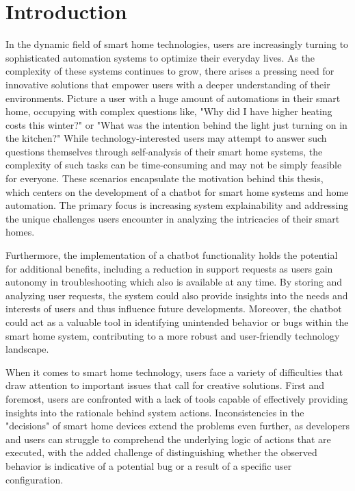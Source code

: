\chapter{Introduction}

In the dynamic field of smart home technologies, users are increasingly turning to sophisticated automation systems to optimize their everyday lives.
As the complexity of these systems continues to grow, there arises a pressing need for innovative solutions that empower users with a deeper understanding of their environments. 
Picture a user with a huge amount of automations in their smart home, occupying with complex questions like, "Why did I have higher heating costs this winter?" or "What was the intention behind the light just turning on in the kitchen?"
While technology-interested users may attempt to answer such questions themselves through self-analysis of their smart home systems, the complexity of such tasks can be time-consuming and may not be simply feasible for everyone.
These scenarios encapsulate the motivation behind this thesis, which centers on the development of a chatbot for smart home systems and home automation.
The primary focus is increasing system explainability and addressing the unique challenges users encounter in analyzing the intricacies of their smart homes.

Furthermore, the implementation of a chatbot functionality holds the potential for additional benefits, including a reduction in support requests as users gain autonomy in troubleshooting which also is available at any time. 
By storing and analyzing user requests, the system could also provide insights into the needs and interests of users and thus influence future developments. 
Moreover, the chatbot could act as a valuable tool in identifying unintended behavior or bugs within the smart home system, contributing to a more robust and user-friendly technology landscape.

When it comes to smart home technology, users face a variety of difficulties that draw attention to important issues that call for creative solutions.  First and foremost, users are confronted with a lack of tools capable of effectively providing insights into the rationale behind system actions.
Inconsistencies in the "decisions" of smart home devices extend the problems even further, as developers and users can struggle to comprehend the underlying logic of actions that are executed, with the added challenge of distinguishing whether the observed behavior is indicative of a potential bug or a result of a specific user configuration.

